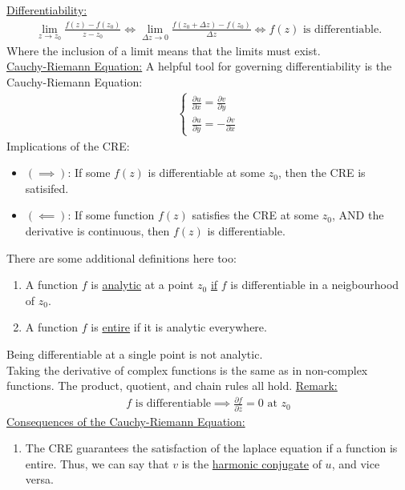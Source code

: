 \documentclass{article}
\newcommand{\gap}{\medskip\\}
\newcommand{\sheader}[1]{\underline{#1:}}
\begin{document}
    \sheader{Differentiability}
    \begin{align*}
        \lim_{z \to z_0} \frac{f(z) - f(z_0)}{z - z_0} \iff \lim_{\Delta z \to 0} \frac{f(z_0 + \Delta z) - f(z_0)}{\Delta z} \iff f(z) \textrm{ is differentiable.}
    \end{align*}
    Where the inclusion of a limit means that the limits must exist.
    \gap
    \sheader{Cauchy-Riemann Equation}
    A helpful tool for governing differentiability is the Cauchy-Riemann Equation:
    \begin{align*}
        \begin{cases}
            \frac{\partial u}{\partial x} = \frac{\partial v}{\partial y}\\
            \frac{\partial u}{\partial y} = -\frac{\partial v}{\partial x}
        \end{cases}
    \end{align*}
    Implications of the CRE:
    \begin{itemize}
        \item $(\implies)$: If some $f(z)$ is differentiable at some $z_0$, then 
        the CRE is satisifed.
        \item $(\impliedby)$: If some function $f(z)$ satisfies the CRE at some $z_0$,
        AND the derivative is continuous, then $f(z)$ is differentiable.
    \end{itemize}

    There are some additional definitions here too:
    \begin{enumerate}
        \item A function $f$ is \underline{analytic} at a point $z_0$ \underline{if} $f$ is differentiable in a neigbourhood of $z_0$.
        \item A function $f$ is \underline{entire} if it is analytic everywhere.
    \end{enumerate}
    Being differentiable at a single point is not analytic.
    \gap
    Taking the derivative of complex functions is the same as in 
    non-complex functions. The product, quotient, and chain rules all hold.
    \pagebreak
    \sheader{Remark}
    \begin{align*}
        f \textrm{ is differentiable} \implies \frac{\partial f}{\partial \overline{z}} = 0 \textrm{ at } z_0
    \end{align*}
    \sheader{Consequences of the Cauchy-Riemann Equation}
    \begin{enumerate}
        \item The CRE guarantees the satisfaction of the laplace equation if a 
        function is entire. Thus, we can say that $v$ is the \underline{harmonic conjugate}
        of $u$, and vice versa.
    \end{enumerate}
\end{document}
